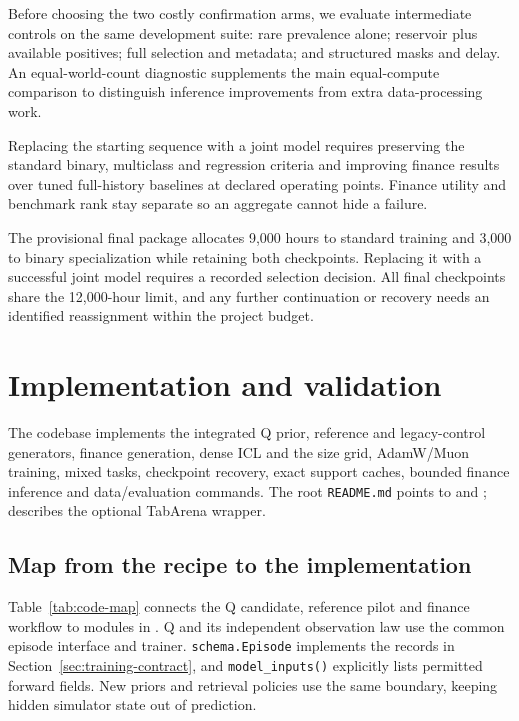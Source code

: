 \documentclass[11pt]{article}
\begin{document}
Before choosing the two costly confirmation arms, we evaluate intermediate controls on the same development suite: rare prevalence alone; reservoir plus available positives; full selection and metadata; and structured masks and delay. An equal-world-count diagnostic supplements the main equal-compute comparison to distinguish inference improvements from extra data-processing work.

Replacing the starting sequence with a joint model requires preserving the standard binary, multiclass and regression criteria and improving finance results over tuned full-history baselines at declared operating points. Finance utility and benchmark rank stay separate so an aggregate cannot hide a failure.

The provisional final package allocates 9,000 hours to standard training and 3,000 to binary specialization while retaining both checkpoints. Replacing it with a successful joint model requires a recorded selection decision. All final checkpoints share the 12,000-hour limit, and any further continuation or recovery needs an identified reassignment within the project budget.



\section{Implementation and validation}
\label{sec:experiments}

The codebase implements the integrated Q prior, reference and legacy-control generators, finance generation, dense ICL and the size grid, AdamW/Muon training, mixed tasks, checkpoint recovery, exact support caches, bounded finance inference and data/evaluation commands. The root \texttt{README.md} points to  and ;  describes the optional TabArena wrapper.

\subsection{Map from the recipe to the implementation}
\label{sec:code-map}

Table~\ref{tab:code-map} connects the Q candidate, reference pilot and finance workflow to modules in . Q and its independent observation law use the common episode interface and trainer. \texttt{schema.Episode} implements the records in Section~\ref{sec:training-contract}, and \texttt{model\_inputs()} explicitly lists permitted forward fields. New priors and retrieval policies use the same boundary, keeping hidden simulator state out of prediction.
\end{document}
